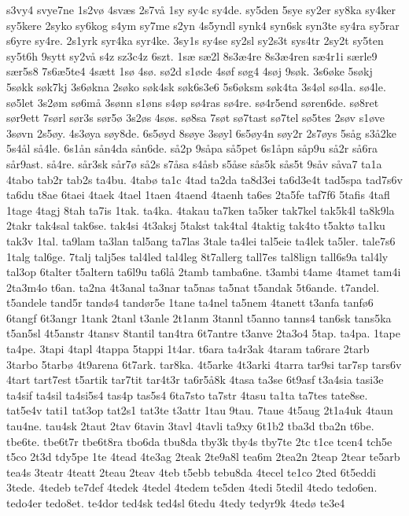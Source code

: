 {s3vy4
svye7ne
1s2vø
4svæs
2s7vå
1sy
sy4c
sy4de.
sy5den
5sye
sy2er
sy8ka
sy4ker
sy5kere
2syko
sy6kog
s4ym
sy7me
s2yn
4s5yndl
synk4
syn6sk
syn3te
sy4ra
sy5rar
s6yre
sy4re.
2s1yrk
syr4ka
syr4ke.
3sy1s
sy4se
sy2sl
sy2s3t
sys4tr
2sy2t
sy5ten
sy5t6h
9sytt
sy2vå
s4z
sz3c4z
6szt.
1sæ
sæ2l
8s3æ4re
8s3æ4ren
sæ4r1i
særle9
sær5s8
7s6æ5te4
4sætt
1sø
4sø.
sø2d
s1øde
4søf
søg4
4søj
9søk.
3s6øke
5søkj
5søkk
søk7kj
3s6økna
2søko
søk4sk
søk6s3e6
5s6øksm
søk4ta
3s4øl
sø4la.
sø4le.
sø5let
3s2øm
sø6må
3sønn
s1øns
s4øp
sø4ras
sø4re.
sø4r5end
søren6de.
sø8ret
sør9ett
7sørl
sør3s
sør5ø
3s2øs
4søs.
sø8sa
7søt
sø7tast
sø7tel
sø5tes
2søv
s1øve
3søvn
2s5øy.
4s3øya
søy8de.
6s5øyd
8søye
3søyl
6s5øy4n
søy2r
2s7øys
5såg
s3å2ke
5s4ål
så4le.
6s1ån
sån4da
sån6de.
så2p
9såpa
så5pet
6s1åpn
såp9u
så2r
så6ra
sår9ast.
så4re.
sår3sk
sår7ø
så2s
s7åsa
s4åsb
s5åse
sås5k
sås5t
9såv
såva7
ta1a
4tabo
tab2r
tab2s
ta4bu.
4tabø
ta1c
4tad
ta2da
ta8d3ei
ta6d3e4t
tad5spa
tad7s6v
ta6du
t8ae
6taei
4taek
4tael
1taen
4taend
4taenh
ta6es
2ta5fe
taf7f6
5tafis
4tafl
1tage
4tagj
8tah
ta7is
1tak.
ta4ka.
4takau
ta7ken
ta5ker
tak7kel
tak5k4l
ta8k9la
2takr
tak4sal
tak6se.
tak4si
4t3aksj
5takst
tak4tal
4taktig
tak4to
t5aktø
ta1ku
tak3v
1tal.
ta9lam
ta3lan
tal5ang
ta7las
3tale
ta4lei
tal5eie
ta4lek
ta5ler.
tale7s6
1talg
tal6ge.
7talj
talj5es
tal4led
tal4leg
8t7allerg
tall7es
tal8lign
tall6s9a
tal4ly
tal3op
6talter
t5altern
ta6l9u
ta6lå
2tamb
tamba6ne.
t3ambi
t4ame
4tamet
tam4i
2ta3m4o
t6an.
ta2na
4t3anal
ta3nar
ta5nas
ta5nat
t5andak
5t6ande.
t7andel.
t5andele
tand5r
tandø4
tandør5e
1tane
ta4nel
ta5nem
4tanett
t3anfa
tanfø6
6tangf
6t3angr
1tank
2tanl
t3anle
2t1anm
3tannl
t5anno
tanns4
tan6sk
tans5ka
t5an5sl
4t5anstr
4tansv
8tantil
tan4tra
6t7antre
t3anve
2ta3o4
5tap.
ta4pa.
1tape
ta4pe.
3tapi
4tapl
4tappa
5tappi
1t4ar.
t6ara
ta4r3ak
4taram
ta6rare
2tarb
3tarbo
5tarbø
4t9arena
6t7ark.
tar8ka.
4t5arke
4t3arki
4tarra
tar9si
tar7sp
tars6v
4tart
tart7est
t5artik
tar7tit
tar4t3r
ta6r5å8k
4tasa
ta3se
6t9asf
t3a4sia
tasi3e
ta4sif
ta4sil
ta4si5s4
tas4p
tas5s4
6ta7sto
ta7str
4tasu
ta1ta
ta7tes
tate8se.
tat5e4v
tati1
tat3op
tat2s1
tat3te
t3attr
1tau
9tau.
7taue
4t5aug
2t1a4uk
4taun
tau4ne.
tau4sk
2taut
2tav
6tavin
3tavl
4tavli
ta9xy
6t1b2
tba3d
tba2n
t6be.
tbe6te.
tbe6t7r
tbe6t8ra
tbo6da
tbu8da
tby3k
tby4s
tby7te
2tc
t1ce
tcen4
tch5e
t5co
2t3d
tdy5pe
1te
4tead
4te3ag
2teak
2te9a8l
tea6m
2tea2n
2teap
2tear
te5arb
tea4s
3teatr
4teatt
2teau
2teav
4teb
t5ebb
tebu8da
4tecel
te1co
2ted
6t5eddi
3tede.
4tedeb
te7def
4tedek
4tedel
4tedem
te5den
4tedi
5tedil
4tedo
tedo6en.
tedo4er
tedo8et.
te4dor
ted4sk
ted4sl
6tedu
4tedy
tedyr9k
4tedø
te3e4
}
